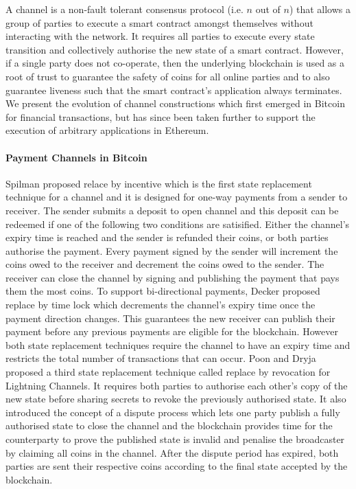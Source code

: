 \documentclass{llncs}
\begin{document}
A channel is a non-fault tolerant consensus protocol (i.e. $n$ out of $n$) that allows a group of parties to execute a smart contract amongst themselves without interacting with the network. 
It requires all parties to execute every state transition and collectively authorise the new state of a smart contract.
However, if a single party does not co-operate, then the underlying blockchain is used as a root of trust to guarantee the safety of coins for all online parties and to also guarantee liveness such that the smart contract's application always terminates. 
We present the evolution of channel constructions which first emerged in Bitcoin for financial transactions, but has since been taken further to support the execution of arbitrary applications in Ethereum.

\paragraph{Payment Channels in Bitcoin} 
Spilman proposed relace by incentive which is the first state replacement technique for a channel and it is designed for one-way payments from a sender to receiver.
The sender submits a deposit to open  channel and this deposit can be redeemed if one of the following two conditions are satisified. 
Either the channel's expiry time is reached and the sender is refunded their coins, or both parties authorise the payment. 
Every payment signed by the sender will increment the coins owed to the receiver and decrement the coins owed to the sender.  
The receiver can close the channel by signing and publishing the payment that pays them the most coins. 
To support bi-directional payments, Decker proposed replace by time lock which decrements the channel's expiry time once the payment direction changes.
This guarantees the new receiver can publish their payment before any previous payments are eligible for the blockchain. 
However both state replacement techniques require the channel to have an expiry time and restricts the total number of transactions that can occur. 
Poon and Dryja proposed a third state replacement technique called replace by revocation for Lightning Channels.  
It requires both parties to authorise each other's copy of the new state before sharing secrets to revoke the previously authorised state. 
It also introduced the concept of a dispute process which lets one party publish a fully authorised state to close the channel and the blockchain provides time for the counterparty to prove the published state is invalid and penalise the broadcaster by claiming all coins in the channel.  
After the dispute period has expired, both parties are sent their respective coins according to the final state accepted by the blockchain. 
\end{document}
